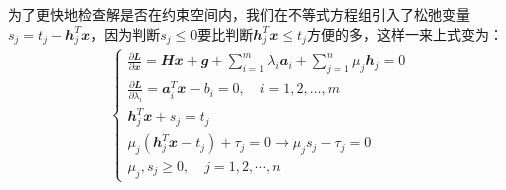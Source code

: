为了更快地检查解是否在约束空间内，我们在不等式方程组引入了松弛变量$s_j=t_j-\mathbfit{h}_j^T\mathbfit{x}$，因为判断$s_j\leq0$要比判断$\mathbfit{h}_j^T\mathbfit{x}\leq t_j$方便的多，这样一来上式变为：
\begin{align}
  \begin{cases}
    \frac{\partial \mathbfit{L}}{\partial \mathbfit{x}}=\mathbfit{H}\mathbfit{x}+\mathbfit{g}+\sum_{i=1}^{m}\lambda_i\mathbfit{a}_i+\sum_{j=1}^{n}\mu_j\mathbfit{h}_j=0\\
    \frac{\partial \mathbfit{L}}{\partial \lambda_i}=\mathbfit{a}_i^T\mathbfit{x}-b_i=0, \quad i = 1, 2, \dots, m\\
    \mathbfit{h}_j^T\mathbfit{x}+s_j=t_j\\
    \mu_j(\mathbfit{h}_j^T\mathbfit{x}-t_j)+\tau_j=0\to \mu_j s_j-\tau_j=0\\
    \mu_j, s_j\geq 0, \quad j= 1, 2, \cdots, n
  \end{cases}
\end{align}

